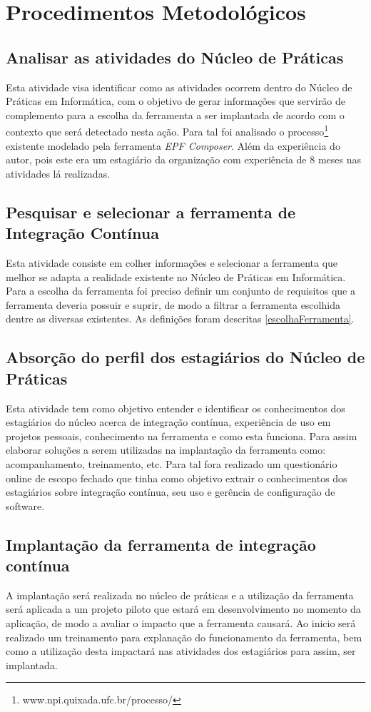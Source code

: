 \chapter{Procedimentos Metodológicos}\label{metodologia}

\section{Analisar as atividades do Núcleo de Práticas}
Esta atividade visa identificar como as atividades ocorrem dentro do Núcleo de Práticas em Informática, com o objetivo de gerar informações que servirão de complemento para a escolha da ferramenta a ser implantada de acordo com o contexto que será detectado nesta ação. Para tal foi analisado o processo\footnote{www.npi.quixada.ufc.br/processo/} existente modelado pela ferramenta \textit{EPF Composer}. Além da experiência do autor, pois este era um estagiário da organização com experiência de 8 meses nas atividades lá realizadas. 

\section{Pesquisar e selecionar a ferramenta de Integração Contínua}

Esta atividade consiste em  colher informações e selecionar a ferramenta que melhor se adapta a realidade existente no Núcleo de Práticas em Informática. 
Para a escolha da ferramenta foi preciso definir um conjunto de requisitos que a ferramenta deveria possuir e suprir, de modo a filtrar a ferramenta escolhida dentre as diversas existentes. As definições foram descritas \autoref{escolhaFerramenta}. 

\section{Absorção do perfil dos estagiários do Núcleo de Práticas}
Esta atividade tem como objetivo entender e identificar os conhecimentos dos estagiários do núcleo acerca de integração contínua, experiência de uso em projetos pessoais, conhecimento na ferramenta e como esta funciona. Para assim elaborar soluções a serem utilizadas na implantação da ferramenta como: acompanhamento, treinamento, etc. Para tal fora realizado um questionário online de escopo fechado que tinha como objetivo extrair o conhecimentos dos estagiários sobre integração contínua, seu uso e gerência de configuração de software.

\section{Implantação da ferramenta de integração contínua}
A implantação será realizada no núcleo de práticas e a utilização da ferramenta será aplicada a um projeto piloto que estará em desenvolvimento no momento da aplicação, de modo a avaliar o impacto que a ferramenta causará. Ao inicio será realizado um treinamento para explanação do funcionamento da ferramenta, bem como a utilização desta impactará nas atividades dos estagiários para assim, ser implantada.

